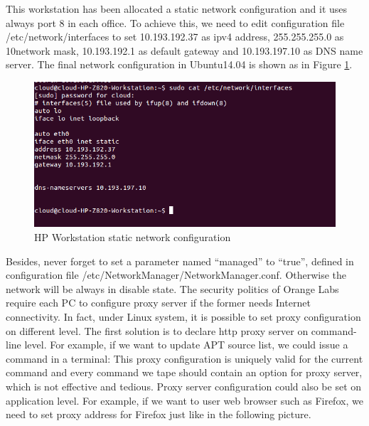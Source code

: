 This workstation has been allocated a static network configuration and it uses always port 8 in each office. To achieve
this, we need to edit configuration file /etc/network/interfaces to set 10.193.192.37 as ipv4 address, 255.255.255.0 as
10network mask, 10.193.192.1 as default gateway and 10.193.197.10 as DNS name server. The final network configuration in 
Ubuntu14.04 is shown as in Figure \ref{fig:HP Workstation static network configuration}.

\begin{figure}[htbp]
	\centering
		\includegraphics[scale = 0.8]{Figures/Figure5.png}
	\caption[HP Workstation static network configuration]{HP Workstation static network configuration}
	\label{fig:HP Workstation static network configuration}
\end{figure}

Besides, never forget to set a parameter named “managed” to “true”, defined in configuration file /etc/NetworkManager/NetworkManager.conf. 
Otherwise the network will be always in disable state. The security politics of Orange Labs require each PC to configure proxy server if the 
former needs Internet connectivity. In fact, under Linux system, it is possible to set proxy configuration on different level. The first 
solution is to declare http proxy server on command-line level. For example, if we want to update APT source list, we could issue a command in 
a terminal:
This proxy configuration is uniquely valid for the current command and every command we tape should contain an option for proxy server, which is
not effective and tedious. Proxy server configuration could also be set on application level. For example, if we want to user web browser such 
as Firefox, we need to set proxy address for Firefox just like in the following picture.

